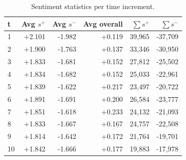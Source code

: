 \begin{table}[t]
\centering
\caption{Sentiment statistics per time increment.}
\label{tab:sent}
\begin{tabular}{lrrrrr}
\toprule
t & Avg $s^{+}$ & Avg $s^{-}$ & Avg overall & $\sum s^{+}$ & $\sum s^{-}$ \\
\midrule
1 & +2.101 & -1.982 & +0.119 & 39,965 & -37,709 \\
2 & +1.900 & -1.763 & +0.137 & 33,346 & -30,950 \\
3 & +1.833 & -1.681 & +0.152 & 27,812 & -25,502 \\
4 & +1.834 & -1.682 & +0.152 & 25,033 & -22,961 \\
5 & +1.839 & -1.622 & +0.217 & 23,497 & -20,722 \\
6 & +1.891 & -1.691 & +0.200 & 26,584 & -23,777 \\
7 & +1.851 & -1.618 & +0.233 & 24,132 & -21,093 \\
8 & +1.833 & -1.667 & +0.167 & 24,757 & -22,508 \\
9 & +1.814 & -1.642 & +0.172 & 21,764 & -19,701 \\
10 & +1.842 & -1.666 & +0.177 & 19,883 & -17,978 \\
\bottomrule
\end{tabular}
\end{table}
